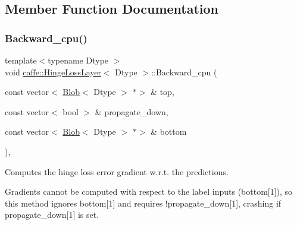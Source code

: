\subsection{Member Function Documentation}
\mbox{\label{classcaffe_1_1_hinge_loss_layer_a4eb93cbad1070ce4e6e4de8fa1eb01ab}} 
\subsubsection{\texorpdfstring{Backward\+\_\+cpu()}{Backward\_cpu()}\hspace{0.1cm}{\footnotesize\ttfamily [1/2]}}
{\footnotesize\ttfamily template$<$typename Dtype $>$ \\
void \mbox{\hyperlink{classcaffe_1_1_hinge_loss_layer}{caffe\+::\+Hinge\+Loss\+Layer}}$<$ Dtype $>$\+::Backward\+\_\+cpu (\begin{DoxyParamCaption}\item[{const vector$<$ \mbox{\hyperlink{classcaffe_1_1_blob}{Blob}}$<$ Dtype $>$ $\ast$$>$ \&}]{top,  }\item[{const vector$<$ bool $>$ \&}]{propagate\+\_\+down,  }\item[{const vector$<$ \mbox{\hyperlink{classcaffe_1_1_blob}{Blob}}$<$ Dtype $>$ $\ast$$>$ \&}]{bottom }\end{DoxyParamCaption})\hspace{0.3cm}{\ttfamily [protected]}, {\ttfamily [virtual]}}



Computes the hinge loss error gradient w.\+r.\+t. the predictions. 

Gradients cannot be computed with respect to the label inputs (bottom\mbox{[}1\mbox{]}), so this method ignores bottom\mbox{[}1\mbox{]} and requires !propagate\+\_\+down\mbox{[}1\mbox{]}, crashing if propagate\+\_\+down\mbox{[}1\mbox{]} is set.


